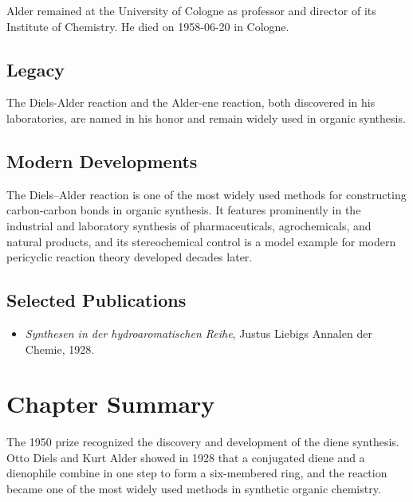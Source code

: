 Alder remained at the University of Cologne as professor and director of its Institute of Chemistry. He died on 1958-06-20 in Cologne.

\subsection*{Legacy}

The Diels-Alder reaction and the Alder-ene reaction, both discovered in his laboratories, are named in his honor and remain widely used in organic synthesis.

\subsection*{Modern Developments}

The Diels–Alder reaction is one of the most widely used methods for constructing carbon-carbon bonds in organic synthesis. It features prominently in the industrial and laboratory synthesis of pharmaceuticals, agrochemicals, and natural products, and its stereochemical control is a model example for modern pericyclic reaction theory developed decades later.

\subsection*{Selected Publications}

\begin{itemize}

\item \emph{Synthesen in der hydroaromatischen Reihe}, Justus Liebigs Annalen der Chemie, 1928.

\end{itemize}

\clearpage

\section*{Chapter Summary}

The 1950 prize recognized the discovery and development of the diene synthesis. Otto Diels and Kurt Alder showed in 1928 that a conjugated diene and a dienophile combine in one step to form a six-membered ring, and the reaction became one of the most widely used methods in synthetic organic chemistry.
